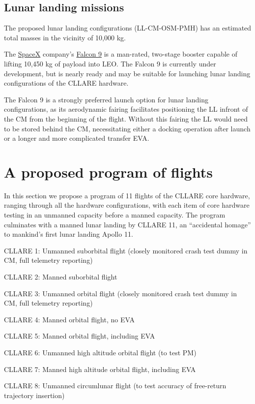 \documentclass{report}
\begin{document}
\subsection{Lunar landing missions}

The proposed lunar landing configurations (LL-CM-OSM-PMH) has an estimated total masses in the vicinity of 10,000 kg.

The \href{http://spacex.com}{SpaceX} company's \href{http://spacex.com/falcon9.php}{Falcon 9} is a man-rated, two-stage booster capable of lifting 10,450 kg of payload into LEO.  The Falcon 9 is currently under development, but is nearly ready and may be suitable for launching lunar landing configurations of the CLLARE hardware.

The Falcon 9 is a strongly preferred launch option for lunar landing configurations, as its aerodynamic fairing facilitates positioning the LL infront of the CM from the beginning of the flight.  Without this fairing the LL would need to be stored behind the CM, necessitating either a docking operation after launch or a longer and more complicated transfer EVA.

\section{A proposed program of flights}

In this section we propose a program of 11 flights of the CLLARE core hardware, ranging through all the hardware configurations, with each item of core hardware testing in an unmanned capacity before a manned capacity.  The program culminates with a manned lunar landing by CLLARE 11, an ``accidental homage'' to mankind's first lunar landing Apollo 11.

CLLARE 1: Unmanned suborbital flight (closely monitored crash test dummy in CM, full telemetry reporting)

CLLARE 2: Manned suborbital flight

CLLARE 3: Unmanned orbital flight (closely monitored crash test dummy in CM, full telemetry reporting)

CLLARE 4: Manned orbital flight, no EVA

CLLARE 5: Manned orbital flight, including EVA

CLLARE 6: Unmanned high altitude orbital flight (to test PM)

CLLARE 7: Manned high altitude orbital flight, including EVA

CLLARE 8: Unmanned circumlunar flight (to test accuracy of free-return trajectory insertion)
\end{document}
